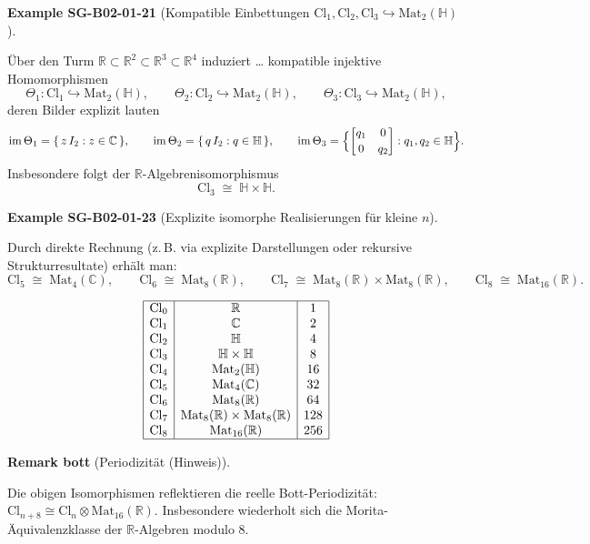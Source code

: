 \documentclass[10pt, letterpaper]{article}
\newcommand{\R}{\mathbb{R}}
\newcommand{\QU}{\mathbb{H}}
\newcommand{\C}{\mathbb{C}}
\newcommand{\Cl}{\mathrm{Cl}}
\newcommand{\Mat}{\mathrm{Mat}}
\newcommand{\CustomHeading}[3]{%
  \par\medskip\noindent%
  \textbf{#1 #2} \textnormal{(#3)}.\enskip%
}
\newenvironment{REM}[2]{\begin{unitbox}\CustomHeading{Remark}{#1}{#2}}{\end{unitbox}}
\newenvironment{EXA}[2]{\begin{unitbox}\CustomHeading{Example}{#1}{#2}}{\end{unitbox}}
\begin{document}
\begin{EXA}{SG-B02-01-21}{Kompatible Einbettungen \(\Cl_1,\Cl_2,\Cl_3\hookrightarrow \Mat_2(\QU)\)}
Über den Turm \(\R\subset\R^2\subset\R^3\subset\R^4\) induziert … kompatible injektive Homomorphismen
\[
\Theta_1:\Cl_1\hookrightarrow \Mat_2(\QU),\qquad
\Theta_2:\Cl_2\hookrightarrow \Mat_2(\QU),\qquad
\Theta_3:\Cl_3\hookrightarrow \Mat_2(\QU),
\]
deren Bilder explizit lauten
\[
\mathrm{im}\,\Theta_1=\{\,z\,I_2: z\in\C\,\},\qquad
\mathrm{im}\,\Theta_2=\{\,q\,I_2: q\in\QU\,\},\qquad
\mathrm{im}\,\Theta_3=\Bigl\{\begin{bmatrix}q_1&0\\[2pt]0&q_2\end{bmatrix}: q_1,q_2\in\QU\Bigr\}.
\]
Insbesondere folgt der \(\R\)-Algebrenisomorphismus
\[
\Cl_3 \;\cong\; \QU\times \QU.
\]
\end{EXA}



\begin{EXA}{SG-B02-01-23}{Explizite isomorphe Realisierungen für kleine $n$}
Durch direkte Rechnung (z.\,B. via explizite Darstellungen oder rekursive Struktur­resultate) erhält man:
\[
\Cl_5 \;\cong\; \Mat_4(\C),\qquad
\Cl_6 \;\cong\; \Mat_8(\R),\qquad
\Cl_7 \;\cong\; \Mat_8(\R)\times\Mat_8(\R),\qquad
\Cl_8 \;\cong\; \Mat_{16}(\R).
\]


\[
\begin{array}{|c|c|c|}
\hline
\Cl_0 & \R & 1\\
\Cl_1 & \C & 2\\
\Cl_2 & \QU & 4\\
\Cl_3 & \QU\times\QU & 8\\
\Cl_4 & \Mat_2(\QU) & 16\\
\Cl_5 & \Mat_4(\C) & 32\\
\Cl_6 & \Mat_8(\R) & 64\\
\Cl_7 & \Mat_8(\R)\times \Mat_8(\R) & 128\\
\Cl_8 & \Mat_{16}(\R) & 256\\
\hline
\end{array}
\]
\end{EXA}


\begin{REM}{bott}{Periodizität (Hinweis)}
Die obigen Isomorphismen reflektieren die reelle Bott-Periodizität:
\(\Cl_{n+8}\cong \Cl_n\otimes \Mat_{16}(\R)\).
Insbesondere wiederholt sich die Morita-Äquivalenzklasse der \(\R\)-Algebren modulo \(8\).
\end{REM}
\end{document}
